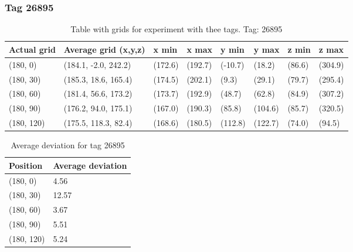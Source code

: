 \subsubsection{Tag 26895}
\begin{table}[H] 
    \begin{tabular}{|l|l|l|l|l|l|l|l|}
    \hline
    Actual grid & Average grid (x,y,z)   & x min   & x max   & y min    & y max   & z min   & z max    \\ \hline
    (180, 0)     & (184.1, -2.0, 242.2)      & (172.6)     & (192.7)    & (-10.7)     & (18.2)      & (86.6)     & (304.9)    \\ \hline
    (180, 30)     & (185.3, 18.6, 165.4)      & (174.5)     & (202.1)    & (9.3)     & (29.1)      & (79.7)     & (295.4)    \\ \hline
    (180, 60)     & (181.4, 56.6, 173.2)      & (173.7)     & (192.9)    & (48.7)     & (62.8)      & (84.9)     & (307.2)    \\ \hline
    (180, 90)     & (176.2, 94.0, 175.1)      & (167.0)     & (190.3)    & (85.8)     & (104.6)      & (85.7)     & (320.5)    \\ \hline
    (180, 120)     & (175.5, 118.3, 82.4)      & (168.6)     & (180.5)    & (112.8)     & (122.7)      & (74.0)     & (94.5)    \\ \hline
\end{tabular}
\label{Tab:three-tag-experiment-result-tag-26895}
\caption{Table with grids for experiment with thee tags. Tag: 26895}
\end{table}

\begin{table}[]
    \centering
    \begin{tabular}{|l|l|}
    \hline
    Position   & Average deviation \\ \hline
    (180, 0)   & 4.56              \\ \hline
    (180, 30)  & 12.57             \\ \hline
    (180, 60)  & 3.67              \\ \hline
    (180, 90)  & 5.51              \\ \hline
    (180, 120) & 5.24              \\ \hline
    \end{tabular}
\caption{Average deviation for tag 26895}
\end{table}

